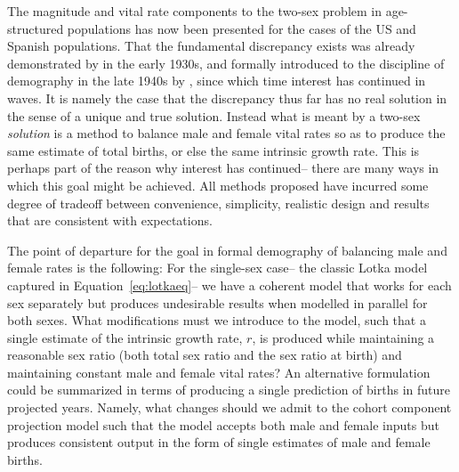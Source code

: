  \FloatBarrier

The magnitude and vital rate components to the two-sex problem in age-structured
populations has now been presented for the cases of the US and Spanish
populations. That the fundamental discrepancy exists was already demonstrated by
\citet{kuczynski1932fertility} in the early 1930s, and formally introduced to
the discipline of demography in the late 1940s by \citet{karmel1947relations},
since which time interest has continued in waves. It is namely the case that the
discrepancy thus far has no real solution in the sense of a unique and true
solution. Instead what is meant by a two-sex \textit{solution} is a method to
balance male and female vital rates so as to produce the same estimate of
total births, or else the same intrinsic growth rate. This is perhaps part of
the reason why interest has continued-- there are many ways in which this goal
might be achieved. All methods proposed have incurred some degree of tradeoff
between convenience, simplicity, realistic design and results that are
consistent with expectations.
 
The point of departure for the goal in formal demography of balancing male and
female rates is the following: For the single-sex case-- the classic Lotka
model captured in Equation~\eqref{eq:lotkaeq}-- we have a coherent model that
works for each sex separately but produces undesirable results when modelled in parallel for both
sexes. What modifications must we introduce to the model, such that a single
estimate of the intrinsic growth rate, $r$, is produced while maintaining a
reasonable sex ratio (both total sex ratio and the sex ratio at birth) and
maintaining constant male and female vital rates? An alternative formulation
could be summarized in terms of producing a single prediction of births in
future projected years. Namely, what changes should we admit to the cohort
component projection model such that the model accepts both male and
female inputs but produces consistent output in the form of single estimates of
male and female births.



 
 
 
 
 
\FloatBarrier